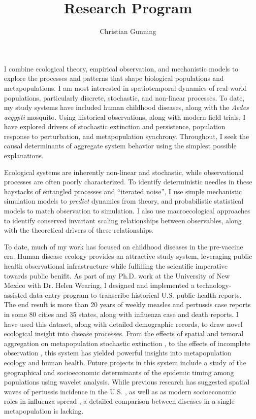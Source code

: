 \documentclass[12pt]{article}
\author{Christian Gunning}
\title{Research Program}
\begin{document}
\maketitle
\thispagestyle{empty}
\linespread{1.25}\selectfont

I combine ecological theory, empirical observation, and 
mechanistic models to explore the processes
and patterns that shape biological populations and metapopulations. 
I am most interested in spatiotemporal dynamics of real-world populations,
particularly discrete, stochastic, and non-linear processes.
To date, my study systems have included human childhood diseases, along
with the {\em Aedes aegypti} mosquito. Using historical observations, along with
modern field trials, I have explored drivers of
stochastic extinction and persistence,
population response to perturbation, and metapopulation synchrony.
Throughout, I seek the causal determinants of aggregate 
system behavior using the simplest possible explanations.

Ecological systems are inherently non-linear and stochastic,
while observational processes are often poorly characterized. 
To identify deterministic needles in these haystacks of 
entangled processes and ``iterated noise'',
I use simple mechanistic simulation models to 
{\em predict} dynamics from theory, and probabilistic 
statistical models to match observation to simulation.
I also use macroecological approaches to identify 
conserved invariant scaling relationships between 
observables, along with the theoretical drivers of these
relationships.

To date, much of my work has focused on childhood diseases 
in the pre-vaccine era. Human disease ecology provides an 
attractive study system, 
leveraging public health observational infrastructure while 
fulfilling the scientific imperative towards public benifit.
As part of my Ph.D. work at the University of New Mexico with
Dr. Helen Wearing, I designed and implemented a 
technology-assisted data entry program to transcribe historical U.S. 
public health reports. The end result is more than 
20 years of weekly measles and
pertussis case reports in some 80 cities and 35 
states, along with influenza case and death reports.
I have used this dataset, along with detailed demographic records, to draw 
novel ecological insight into disease processes. From the 
effects of spatial and temoral aggregation on metapopulation stochastic
extinction \citep{gunning2013probabilistic}, to the effects of incomplete
observation \citep{gunning2014conserved}, this system
has yielded powerful insights into metapopulation 
ecology and human health.
Future projects in this system include a study of 
the geographical and socioeconomic determinants of 
the epidemic timing among populations 
using wavelet analysis.  While previous research has 
suggested spatial waves of pertussis incidence 
in the U.S. \citep{choisy2012changing}, as well as 
as modern socioeconomic roles in influenza spread \citep{viboud2006synchrony}, 
a detailed comparison between diseases in a single 
metapopulation is lacking.
\end{document}
